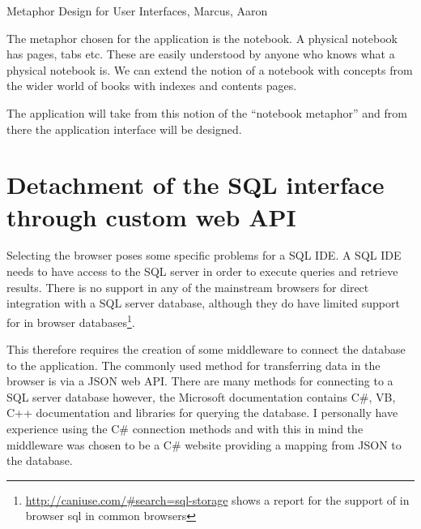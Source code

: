 Metaphor Design for User Interfaces, Marcus, Aaron\cite{Marcus:1998:MDU:286498.286577}

The metaphor chosen for the application is the notebook. A physical
notebook has pages, tabs etc. These are easily understood by
anyone who knows what a physical notebook is. We can extend the notion of a
notebook with concepts from the wider world of books with indexes and
contents pages.

The application will take from this notion of the ``notebook metaphor'' and from
there the application interface will be designed.


\section{Detachment of the SQL interface through custom web
API}\label{detachment-of-the-sql-interface-through-custom-web-api}

Selecting the browser poses some specific problems for a SQL IDE. A SQL IDE
needs to have access to the SQL server in order to execute queries and retrieve
results. There is no support in any of the mainstream browsers for direct
integration with a SQL server database, although they do have limited support
for in browser databases\footnote{\url{http://caniuse.com/\#search=sql-storage}
shows a report for the support of in browser sql in common browsers}.

This therefore requires the creation of some middleware to connect the database
to the application. The commonly used method for transferring data in the
browser is via a JSON web API. There are many methods for connecting to a SQL
server database however, the Microsoft documentation contains C\#, VB, C++
documentation and libraries for querying the database.\cite{sqlserverconnect} I
personally have experience using the C\# connection methods and with this in mind
the middleware was chosen to be a C\# website providing a mapping from JSON to
the database.

